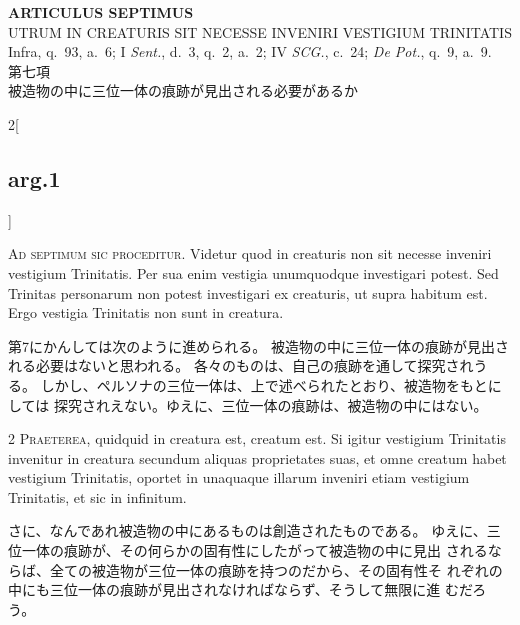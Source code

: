\documentclass[paper=a4paper,fontsize=10pt,jafontsize=9pt,titlepage]{jlreq}
\begin{document}

\begin{center}
 {\Large {\bfseries ARTICULUS SEPTIMUS}}\\
 {\large UTRUM IN CREATURIS SIT NECESSE INVENIRI VESTIGIUM TRINITATIS}\\
 {\footnotesize Infra, q.~93, a.~6; I {\itshape Sent.}, d.~3, q.~2,
 a.~2; IV {\itshape SCG.}, c.~24; {\itshape De Pot.}, q.~9, a.~9.}\\
 {\Large 第七項\\被造物の中に三位一体の痕跡が見出される必要があるか}
\end{center}

\begin{paracol}{2}[\subsection{arg.1}]

{\huge A}{\scshape d septimum sic proceditur}. Videtur quod in
 creaturis non sit necesse inveniri vestigium Trinitatis. Per sua enim
 vestigia unumquodque investigari potest. Sed Trinitas personarum non
 potest investigari ex creaturis, ut supra habitum est. Ergo vestigia
 Trinitatis non sunt in creatura.

\switchcolumn

第7にかんしては次のように進められる。
被造物の中に三位一体の痕跡が見出される必要はないと思われる。
各々のものは、自己の痕跡を通して探究されうる。
しかし、ペルソナの三位一体は、上で述べられたとおり、被造物をもとにしては
 探究されえない。ゆえに、三位一体の痕跡は、被造物の中にはない。


{\scshape 2 Praeterea}, quidquid in creatura est,
 creatum est. Si igitur vestigium Trinitatis invenitur in creatura
 secundum aliquas proprietates suas, et omne creatum habet vestigium
 Trinitatis, oportet in unaquaque illarum inveniri etiam vestigium
 Trinitatis, et sic in infinitum.

\switchcolumn

さに、なんであれ被造物の中にあるものは創造されたものである。
ゆえに、三位一体の痕跡が、その何らかの固有性にしたがって被造物の中に見出
 されるならば、全ての被造物が三位一体の痕跡を持つのだから、その固有性そ
 れぞれの中にも三位一体の痕跡が見出されなければならず、そうして無限に進
 むだろう。


\end{paracol}
\end{document}

